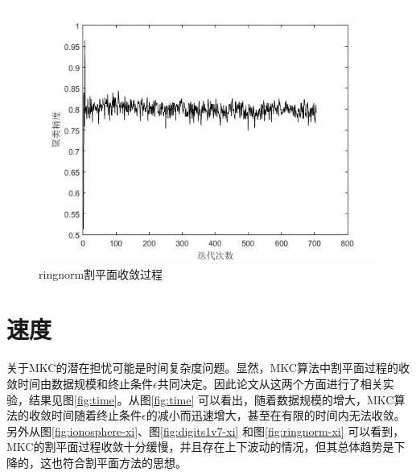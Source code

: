 \begin{figure}[H]
\begin{minipage}[t]{0.45\linewidth}
\includegraphics[width=\textwidth]{figure/ringnorm_acc.jpg}
  \caption{ringnorm割平面收敛过程}
  \label{fig:ringnorm-gpm}
  \end{minipage}
\end{figure}



\section{速度}
关于MKC的潜在担忧可能是时间复杂度问题。显然，MKC算法中割平面过程的收敛时间由数据规模和终止条件$\epsilon$共同决定。因此论文从这两个方面进行了相关实验，结果见图\ref{fig:time}。从图\ref{fig:time} 可以看出，随着数据规模的增大，MKC算法的收敛时间随着终止条件$\epsilon$的减小而迅速增大，甚至在有限的时间内无法收敛。另外从图\ref{fig:ionosphere-xi}、图\ref{fig:digits1v7-xi} 和图\ref{fig:ringnorm-xi} 可以看到，MKC的割平面过程收敛十分缓慢，并且存在上下波动的情况，但其总体趋势是下降的，这也符合割平面方法的思想。

